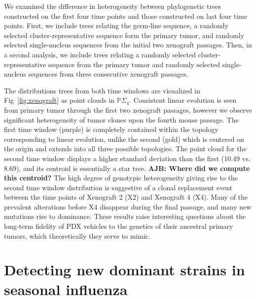 \documentclass[a4paper,11pt]{article}
\begin{document}
We examined the difference in heterogeneity between phylogenetic trees constructed on the first four time points and those constructed on last four time points.
First, we include trees relating the germ-line sequence, a randomly selected cluster-representative sequence form the primary tumor, and randomly selected single-nucleus sequences from the initial two xenograft passages.
Then, in a second analysis, we include trees relating a randomly selected cluster-representative sequence from the primary tumor and randomly selected single-nucleus sequences from three consecutive xenograft passages.

The distributions trees from both time windows are visualized in Fig~\ref{fig:xenograft} as point clouds in $\mathbb{P}\Sigma_4 $.
Consistent linear evolution is seen from primary tumor through the first two xenograft passages, however we observe significant heterogeneity of tumor clones upon the fourth mouse passage.
The first time window (purple) is completely contained within the topology corresponding to linear evolution, unlike the second (gold) which is centered on the origin and extends into all three possible topologies.
The point cloud for the second time window displays a higher standard deviation than the first (10.49 vs. 8.69), and its centroid is essentially a star tree.
{\bf AJB: Where did we compute this centroid?}
The high degree of genotypic heterogeneity giving rise to the second time window distribution is suggestive of a clonal replacement event between the time points of Xenograft 2 (X2) and Xenograft 4 (X4).
Many of the prevalent alterations before X4 disappear during the final passage, and many new mutations rise to dominance.
These results raise interesting questions about the long-term fidelity of PDX vehicles to the genetics of their ancestral primary tumors, which theoretically they serve to mimic.


\section{Detecting new dominant strains in seasonal influenza}\label{sec:flu}
\end{document}
